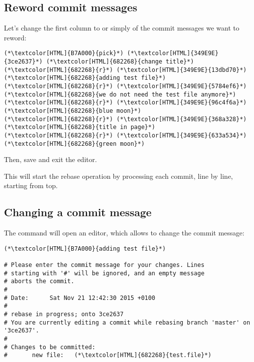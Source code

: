 \subsection{Reword commit messages}
\begin{frame}[fragile]
  \subslidetitle

  Let's change the first column to  or simply  of the commit messages we want to reword:
  \begin{lstlisting}
(*\textcolor[HTML]{B7A000}{pick}*) (*\textcolor[HTML]{349E9E}{3ce2637}*) (*\textcolor[HTML]{682268}{change title}*)
(*\textcolor[HTML]{682268}{r}*) (*\textcolor[HTML]{349E9E}{13dbd70}*) (*\textcolor[HTML]{682268}{adding test file}*)
(*\textcolor[HTML]{682268}{r}*) (*\textcolor[HTML]{349E9E}{5784ef6}*) (*\textcolor[HTML]{682268}{we do not need the test file anymore}*)
(*\textcolor[HTML]{682268}{r}*) (*\textcolor[HTML]{349E9E}{96c4f6a}*) (*\textcolor[HTML]{682268}{blue moon}*)
(*\textcolor[HTML]{682268}{r}*) (*\textcolor[HTML]{349E9E}{368a328}*) (*\textcolor[HTML]{682268}{title in page}*)
(*\textcolor[HTML]{682268}{r}*) (*\textcolor[HTML]{349E9E}{633a534}*) (*\textcolor[HTML]{682268}{green moon}*)
\end{lstlisting}
  Then, save and exit the editor.

  \vspace{1em}
  This will start the rebase operation by processing each commit, line by line, starting from top.

\end{frame}

\subsection{Changing a commit message}
\begin{frame}[fragile]
  \subslidetitle

  The  command will open an editor, which allows to change the commit message:
  \begin{lstlisting}
(*\textcolor[HTML]{B7A000}{adding test file}*)

# Please enter the commit message for your changes. Lines
# starting with '#' will be ignored, and an empty message
# aborts the commit.
#
# Date:      Sat Nov 21 12:42:30 2015 +0100
#
# rebase in progress; onto 3ce2637
# You are currently editing a commit while rebasing branch 'master' on '3ce2637'.
#
# Changes to be committed:
#       new file:   (*\textcolor[HTML]{682268}{test.file}*)
\end{lstlisting}

\end{frame}

